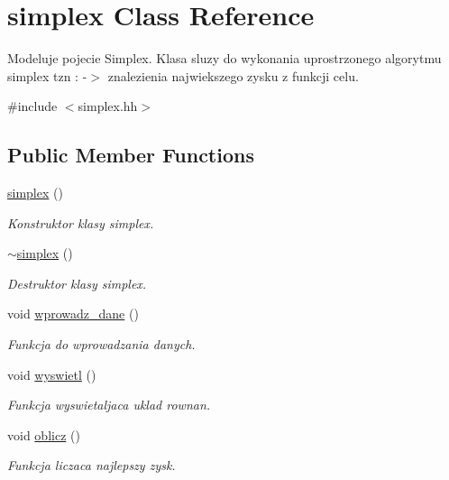 \hypertarget{classsimplex}{\section{simplex Class Reference}
\label{classsimplex}
}


Modeluje pojecie Simplex. Klasa sluzy do wykonania uprostrzonego algorytmu simplex tzn \-: -\/$>$ znalezienia najwiekszego zysku z funkcji celu.  




{\ttfamily \#include $<$simplex.\-hh$>$}

\subsection*{Public Member Functions}
\begin{DoxyCompactItemize}
\item 
\hyperlink{classsimplex_a8aaeb28157215071b929373ec0359653}{simplex} ()
\begin{DoxyCompactList}\small\item\em Konstruktor klasy simplex. \end{DoxyCompactList}\item 
\hyperlink{classsimplex_a5044f01be0ce221495ee6b5a8412f8ab}{$\sim$simplex} ()
\begin{DoxyCompactList}\small\item\em Destruktor klasy simplex. \end{DoxyCompactList}\item 
void \hyperlink{classsimplex_a49d8689f9b244ffd9d1941dcc5382278}{wprowadz\-\_\-dane} ()
\begin{DoxyCompactList}\small\item\em Funkcja do wprowadzania danych. \end{DoxyCompactList}\item 
void \hyperlink{classsimplex_a38765e9873e84c9c1574528d39f5e9d9}{wyswietl} ()
\begin{DoxyCompactList}\small\item\em Funkcja wyswietaljaca uklad rownan. \end{DoxyCompactList}\item 
void \hyperlink{classsimplex_a6b34466c3336fa38ac333b9fbcfe26f4}{oblicz} ()
\begin{DoxyCompactList}\small\item\em Funkcja liczaca najlepszy zysk. \end{DoxyCompactList}\end{DoxyCompactItemize}
